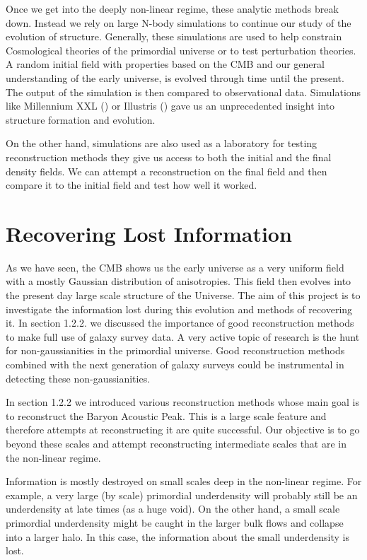 Once we get into the deeply non-linear regime, these analytic methods break down. Instead we rely on large N-body simulations to continue our study of the evolution of structure. Generally, these simulations are used to help constrain Cosmological theories of the primordial universe or to test perturbation theories. A random initial field with properties based on the CMB and our general understanding of the early universe, is evolved through time until the present. The output of the simulation is then compared to observational data. Simulations like Millennium XXL (\cite{Millennium_XXL}) or Illustris (\cite{Illustris_sim}) gave us an unprecedented insight into structure formation and evolution.

On the other hand, simulations are also used as a laboratory for testing reconstruction methods they give us access to both the initial and the final density fields. We can attempt a reconstruction on the final field and then compare it to the initial field and test how well it worked. 

\section{Recovering Lost Information}

As we have seen, the CMB shows us the early universe as a very uniform field with a mostly Gaussian distribution of anisotropies. This field then evolves into the present day large scale structure of the Universe. The aim of this project is to investigate the information lost during this evolution and methods of recovering it. In section 1.2.2. we discussed the importance of good reconstruction methods to make full use of galaxy survey data. A very active topic of research is the hunt for non-gaussianities in the primordial universe. Good reconstruction methods combined with the next generation of galaxy surveys could be instrumental in detecting these non-gaussianities.

In section 1.2.2 we introduced various reconstruction methods whose main goal is to reconstruct the Baryon Acoustic Peak. This is a large scale feature and therefore attempts at reconstructing it are quite successful. Our objective is to go beyond these scales and attempt reconstructing intermediate scales that are in the non-linear regime. 

Information is mostly destroyed on small scales deep in the non-linear regime. For example, a very large (by scale) primordial underdensity will probably still be an underdensity at late times (as a huge void). On the other hand, a small scale primordial underdensity might be caught in the larger bulk flows and collapse into a larger halo. In this case, the information about the small underdensity is lost. 

